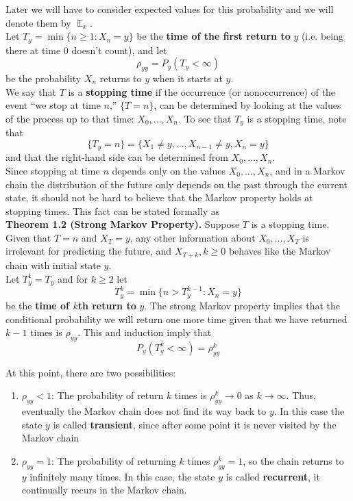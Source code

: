 \documentclass[12pt]{article}
\DeclareMathOperator*{\E}{\mathbb{E}}
\begin{document}
Later we will have to consider expected values for this probability and we will denote them by $\E_x$.\\

Let $T_y = \min \{n \geq 1: X_n = y\}$ be the \textbf{time of the first return to} $y$ (i.e. being there at time $0$ doesn't count), and let $$\rho_{yy} = P_y(T_y < \infty)$$ be the probability $X_n$ returns to $y$ when it starts at $y$.\\

We say that $T$ is a \textbf{stopping time} if the occurrence (or nonoccurrence) of the event ``we stop at time $n$,'' $\{T = n\}$, can be determined by looking at the values of the process up to that time: $X_0, \ldots, X_n$. To see that $T_y$ is a stopping time, note that $$\{T_y = n\} = \{X_1 \neq y, \ldots, X_{n-1} \neq y, X_n = y\}$$ and that the right-hand side can be determined from $X_0, \ldots, X_n$.\\

Since stopping at time $n$ depends only on the values $X_0, \ldots, X_n$, and in a Markov chain the distribution of the future only depends on the past through the current state, it should not be hard to believe that the Markov property holds at stopping times. This fact can be stated formally as\\

\textbf{Theorem 1.2 (Strong Markov Property).} Suppose $T$ is a stopping time. Given that $T = n$ and $X_T = y$, any other information about $X_0, \ldots, X_T$ is irrelevant for predicting the future, and $X_{T+k}, k \geq 0$ behaves like the Markov chain with initial state $y$.\\

Let $T^1_y = T_y$ and for $k \geq 2$ let $$T^k_y = \min \{n > T^{k-1}_y : X_n = y\}$$ be the \textbf{time of $k$th return to} $y$. The strong Markov property implies that the conditional probability we will return one more time given that we have returned $k-1$ times is $\rho_{yy}$. This and induction imply that $$P_y(T^k_y < \infty) = \rho^k_{yy}$$

At this point, there are two possibilities:
\begin{enumerate}
\item $\rho_{yy} < 1$: The probability of return $k$ times is $\rho^k_{yy} \to 0$ as $k \to \infty$. Thus, eventually the Markov chain does not find its way back to $y$. In this case the state $y$ is called \textbf{transient}, since after some point it is never visited by the Markov chain

\item $\rho_{yy} = 1$: The probability of returning $k$ times $\rho_{yy}^k = 1$, so the chain returns to $y$ infinitely many times. In this case, the state $y$ is called \textbf{recurrent}, it continually recurs in the Markov chain.
\end{enumerate}
\end{document}
